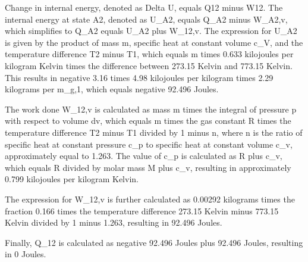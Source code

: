 Change in internal energy, denoted as Delta U, equals Q12 minus W12. The internal energy at state A2, denoted as U_A2, equals Q_A2 minus W_A2,v, which simplifies to Q_A2 equals U_A2 plus W_12,v. The expression for U_A2 is given by the product of mass m, specific heat at constant volume c_V, and the temperature difference T2 minus T1, which equals m times 0.633 kilojoules per kilogram Kelvin times the difference between 273.15 Kelvin and 773.15 Kelvin. This results in negative 3.16 times 4.98 kilojoules per kilogram times 2.29 kilograms per m_g,1, which equals negative 92.496 Joules.

The work done W_12,v is calculated as mass m times the integral of pressure p with respect to volume dv, which equals m times the gas constant R times the temperature difference T2 minus T1 divided by 1 minus n, where n is the ratio of specific heat at constant pressure c_p to specific heat at constant volume c_v, approximately equal to 1.263. The value of c_p is calculated as R plus c_v, which equals R divided by molar mass M plus c_v, resulting in approximately 0.799 kilojoules per kilogram Kelvin.

The expression for W_12,v is further calculated as 0.00292 kilograms times the fraction 0.166 times the temperature difference 273.15 Kelvin minus 773.15 Kelvin divided by 1 minus 1.263, resulting in 92.496 Joules.

Finally, Q_12 is calculated as negative 92.496 Joules plus 92.496 Joules, resulting in 0 Joules.